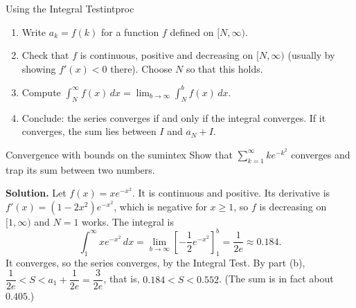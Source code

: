 \documentclass[11pt]{article}
\begin{document}
\begin{proc}{Using the Integral Test}{intproc}
\begin{enumerate}[nosep]
  \item Write $a_k=f(k)$ for a function $f$ defined on $[N,\infty)$.
  \item Check that $f$ is continuous, positive and decreasing on $[N,\infty)$ (usually by showing $f'(x)<0$ there). Choose $N$ so that this holds.
  \item Compute $\int_N^\infty f(x)\,dx=\lim_{b\to\infty}\int_N^bf(x)\,dx$.
  \item Conclude: the series converges if and only if the integral converges. If it converges, the sum lies between $I$ and $a_N+I$.
\end{enumerate}
\end{proc}

\begin{exmp}{Convergence with bounds on the sum}{intex}
Show that $\displaystyle\sum_{k=1}^\infty ke^{-k^2}$ converges and trap its sum between two numbers.

\textbf{Solution.} Let $f(x)=xe^{-x^2}$. It is continuous and positive. Its derivative is $f'(x)=(1-2x^2)e^{-x^2}$, which is negative for $x\ge1$, so $f$ is decreasing on $[1,\infty)$ and $N=1$ works. The integral is
\[
\int_1^\infty xe^{-x^2}\,dx=\lim_{b\to\infty}\left[-\frac12e^{-x^2}\right]_1^b=\frac1{2e}\approx0.184 .
\]
It converges, so the series converges, by the Integral Test. By part (b), $\dfrac1{2e}<S<a_1+\dfrac1{2e}=\dfrac3{2e}$, that is, $0.184<S<0.552$. (The sum is in fact about $0.405$.)
\end{exmp}
\end{document}
